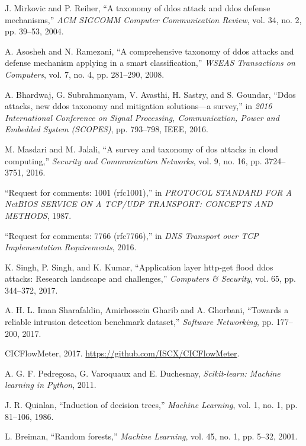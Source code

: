 \documentclass[12pt]{report}
\begin{document}
\begin{thebibliography}{99}
J. Mirkovic and P. Reiher, ``A taxonomy of ddos attack and ddos defense mechanisms,'' \textit{ACM SIGCOMM Computer Communication Review}, vol. 34, no. 2, pp. 39--53, 2004.

A. Asosheh and N. Ramezani, ``A comprehensive taxonomy of ddos attacks and defense mechanism applying in a smart classification,'' \textit{WSEAS Transactions on Computers}, vol. 7, no. 4, pp. 281--290, 2008.

A. Bhardwaj, G. Subrahmanyam, V. Avasthi, H. Sastry, and S. Goundar, ``Ddos attacks, new ddos taxonomy and mitigation solutions---a survey,'' in \textit{2016 International Conference on Signal Processing, Communication, Power and Embedded System (SCOPES)}, pp. 793--798, IEEE, 2016.

M. Masdari and M. Jalali, ``A survey and taxonomy of dos attacks in cloud computing,'' \textit{Security and Communication Networks}, vol. 9, no. 16, pp. 3724--3751, 2016.

``Request for comments: 1001 (rfc1001),'' in \textit{PROTOCOL STANDARD FOR A NetBIOS SERVICE ON A TCP/UDP TRANSPORT: CONCEPTS AND METHODS}, 1987.

``Request for comments: 7766 (rfc7766),'' in \textit{DNS Transport over TCP Implementation Requirements}, 2016.

K. Singh, P. Singh, and K. Kumar, ``Application layer http-get flood ddos attacks: Research landscape and challenges,'' \textit{Computers \& Security}, vol. 65, pp. 344--372, 2017.

A. H. L. Iman Sharafaldin, Amirhossein Gharib and A. Ghorbani, ``Towards a reliable intrusion detection benchmark dataset,'' \textit{Software Networking}, pp. 177--200, 2017.

CICFlowMeter, 2017. \url{https://github.com/ISCX/CICFlowMeter}.

A. G. F. Pedregosa, G. Varoquaux and E. Duchesnay, \textit{Scikit-learn: Machine learning in Python}, 2011.

J. R. Quinlan, ``Induction of decision trees,'' \textit{Machine Learning}, vol. 1, no. 1, pp. 81--106, 1986.

L. Breiman, ``Random forests,'' \textit{Machine Learning}, vol. 45, no. 1, pp. 5--32, 2001.

\end{thebibliography}
\end{document}
